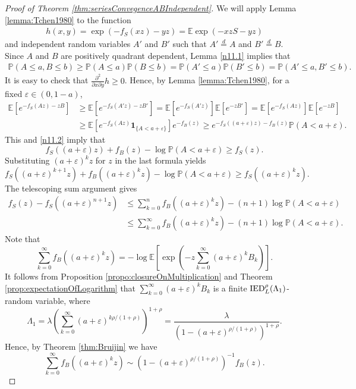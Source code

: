 \documentclass[bj]{imsart}
\numberwithin{equation}{section}
\renewcommand{\P}{\mathbb{P}}
\newcommand{\IED}{{\rm IED}}
\newcommand{\E}{\mathbb{E}}
\newcommand{\1}{\mathbf{1}}
\theoremstyle{definition}
\newcommand{\eps}{\varepsilon}
\begin{document}
\begin{proof}[Proof of Theorem \ref{thm:seriesConvegenceABIndependent}]
We will apply Lemma \ref{lemma:Tchen1980} to the function
\begin{align*}
h(x,y) = \exp(- f_S(xz) -yz) = \E \exp( - xzS - yz)
\end{align*}
and independent random variables $A'$ and $B'$ such that 
$A'\stackrel{d}{=}A$ and  $B'\stackrel{d}{=}B$.
Since  $A$ and $B$ are positively quadrant dependent, Lemma \ref{n11.1} implies that
\begin{align*}
\P(A\leq a, B\leq b)\geq \P(A\leq a)\P( B\leq b) 
=\P(A'\leq a)\P(B'\leq b)
=\P(A'\leq a,B'\leq b).
\end{align*}
It is easy to check that $\frac{\partial^2}{\partial x\partial y}h\geq 0$.
Hence, by Lemma \ref{lemma:Tchen1980}, for a fixed $\eps \in (0, 1-a)$,
\begin{align*}
 \E\left[e^{-f_S(Az)-zB}\right]&\geq 
  \E\left[e^{-f_S(A'z)-zB'}\right]
= \E\left[e^{-f_S(A'z)}\right]\E\left[e^{-zB'}\right]
=\E\left[e^{-f_S(Az)}\right]\E\left[e^{-zB}\right]\\
& \geq \E\left[e^{-f_S(Az)}\1_{\{A<a+\varepsilon\}}\right]e^{-f_B(z)}
\geq e^{-f_S((a+\varepsilon)z)-f_B(z)}\P(A<a+\varepsilon).
\end{align*}
This and \eqref{n11.2} imply that
\begin{equation*} 
f_{S}((a+\varepsilon)z)+f_B(z)-\log\P(A<a+\varepsilon)\geq f_S(z). 
\end{equation*}
Substituting $(a+\varepsilon)^k z$ for $z$ in the last formula yields
\begin{equation*} 
f_{S}((a+\varepsilon)^{k+1}z)+f_B((a+\varepsilon)^k z)-\log\P(A<a+\varepsilon)\geq f_S((a+\varepsilon)^k z). 
\end{equation*}
The telescoping sum argument gives
\begin{align}
\nonumber f_S(z)-f_S((a+\varepsilon)^{n+1}z)&\leq \sum_{k=0}^n f_B((a+\varepsilon)^kz)-(n+1)\log \P(A<a+\varepsilon)\\
&\leq \sum_{k=0}^\infty f_B((a+\varepsilon)^kz)-(n+1)\log \P(A<a+\varepsilon). \label{eq:twoSumsComparison}
\end{align}
Note  that 
$$\sum_{k=0}^{\infty } f_B((a+\varepsilon)^kz)=-\log \E\left[\exp\left(-z\sum_{k=0}^{\infty }(a+\varepsilon)^kB_k\right)\right].$$
It follows from Proposition \ref{propo:closureOnMultiplication} and
 Theorem \ref{prop:expectationOfLogarithm} that $\sum_{k=0}^{\infty }(a+\varepsilon)^kB_k$ is a finite $\IED^\rho_L(\Lambda_1)$-random variable, where
 $$ \Lambda_1=\lambda\left(\sum_{k=0}^{\infty}(a+\eps)^{k\rho/(1+\rho)}\right)^{1+\rho}
= \frac{\lambda} { (1- (a+\eps)^{\rho/(1+\rho)})^{1+\rho}}.
$$
Hence, by Theorem \ref{thm:Bruijin} we have 
\begin{equation}\label{eq:sumAssymptotics}
 \sum_{k=0}^{\infty } f_B((a+\varepsilon)^kz)\sim \left(1-(a+\eps)^{\rho/(1+\rho)}\right)^{-1}f_B(z).
\end{equation}


\end{proof}
\end{document}
